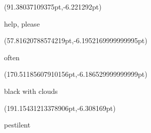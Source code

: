 \documentclass{ransom}
\begin{document}
\begin{foreignpage}
{\begin{textblock*}{38.70305pt}(91.38037109375pt,\pdfpageheight-206.37759399414062pt-6.221292pt)\parbox[b]{38.70305pt}{\begin{blacktext}\begin{latin}help, please\end{latin}\end{blacktext}}\end{textblock*}
\begin{textblock*}{41.76901pt}(57.81620788574219pt,\pdfpageheight-179.37759399414062pt-6.1952169999999995pt)\parbox[b]{41.76901pt}{\begin{blacktext}\begin{latin}often\end{latin}\end{blacktext}}\end{textblock*}
\begin{textblock*}{52.51848pt}(170.51185607910156pt,\pdfpageheight-152.37759399414062pt-6.186529999999999pt)\parbox[b]{52.51848pt}{\begin{blacktext}\begin{latin}black with clouds\end{latin}\end{blacktext}}\end{textblock*}
\begin{textblock*}{32.79457pt}(191.15431213378906pt,\pdfpageheight-125.37759399414062pt-6.308169pt)\parbox[b]{32.79457pt}{\begin{blacktext}\begin{latin}pestilent\end{latin}\end{blacktext}}\end{textblock*}
 }
\end{foreignpage}
\end{document}
